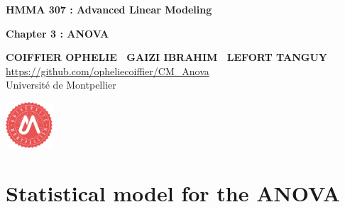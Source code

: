 \documentclass[unknownkeysallowed]{beamer}
\begin{document}



\begin{frame}[noframenumbering]
\thispagestyle{empty}
\bigskip
\bigskip
\begin{center}{
\LARGE\color{marron}
\textbf{HMMA 307 : Advanced Linear Modeling}
\textbf{ }\\
\vspace{0.5cm}
}

\color{marron}
\textbf{Chapter 3 : ANOVA}
\end{center}

\vspace{0.5cm}

\begin{center}
\textbf{COIFFIER OPHELIE \ GAIZI IBRAHIM \ LEFORT TANGUY } \\
\vspace{0.1cm}
\url{https://github.com/opheliecoiffier/CM_Anova}\\
\vspace{0.5cm}
Université de Montpellier \\
\end{center}

\centering
\includegraphics[width=0.13\textwidth]{Logo.pdf}
\end{frame}



\begin{frame}[noframenumbering]
\thispagestyle{empty}
\tableofcontents
\end{frame}




\section{Statistical model for the ANOVA}
\end{document}
